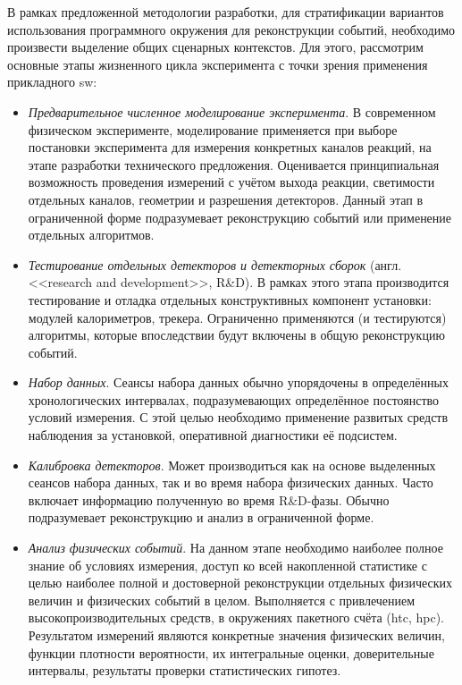 В рамках предложенной методологии разработки, для стратификации вариантов
использования программного окружения для реконструкции событий, необходимо
произвести выделение общих сценарных контекстов. Для этого, рассмотрим
основные этапы жизненного цикла эксперимента с точки зрения применения
прикладного \acrshort{sw}:
\begin{itemize}
    \item \emph{Предварительное численное моделирование эксперимента}. В
    современном физическом эксперименте, моделирование применяется
    при выборе постановки эксперимента для измерения конкретных
    каналов реакций, на этапе разработки технического предложения.
    Оценивается принципиальная возможность проведения измерений с учётом
    выхода реакции, светимости отдельных каналов, геометрии и разрешения
    детекторов. Данный этап в ограниченной форме подразумевает
    реконструкцию событий или применение отдельных алгоритмов.
    \item \emph{Тестирование отдельных детекторов и детекторных сборок}
    (англ. <<research and development>>, R\&D). В рамках этого этапа
    производится тестирование и отладка отдельных конструктивных
    компонент установки: модулей калориметров, трекера. Ограниченно
    применяются (и тестируются) алгоритмы, которые впоследствии будут
    включены в общую реконструкцию событий.
    \item \emph{Набор данных}. Сеансы набора данных обычно упорядочены
    в определённых хронологических интервалах, подразумевающих
    определённое постоянство условий измерения. С этой целью
    необходимо применение развитых средств наблюдения за установкой,
    оперативной диагностики её подсистем.
    \item \emph{Калибровка детекторов}. Может производиться как
    на основе выделенных сеансов набора данных, так и во время
    набора физических данных. Часто включает информацию полученную
    во время R\&D-фазы. Обычно подразумевает реконструкцию и анализ
    в ограниченной форме.
    \item \emph{Анализ физических событий}. На данном этапе необходимо
    наиболее полное знание об условиях измерения, доступ ко всей
    накопленной статистике с целью наиболее полной и достоверной
    реконструкции отдельных физических величин и физических событий
    в целом. Выполняется с привлечением высокопроизводительных
    средств, в окружениях пакетного счёта (\acrshort{htc}, \acrshort{hpc}).
    Результатом измерений являются конкретные значения физических величин,
    функции плотности вероятности, их интегральные оценки,
    доверительные интервалы, результаты проверки статистических гипотез.
\end{itemize}

